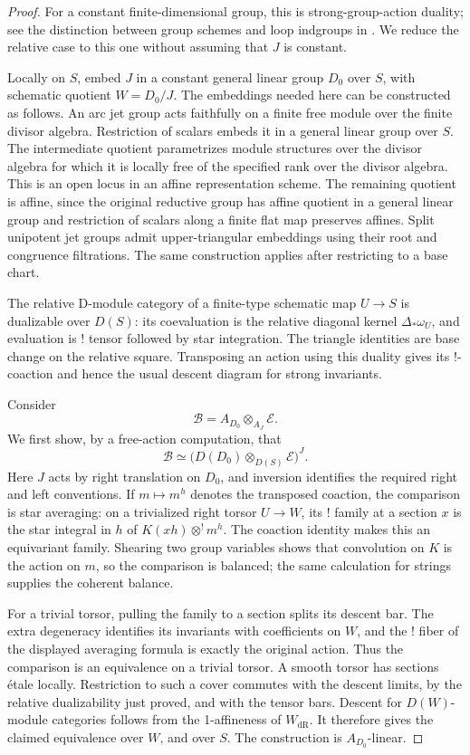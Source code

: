 \documentclass[11pt]{article}
\numberwithin{equation}{section}
\theoremstyle{definition}
\theoremstyle{remark}
\begin{document}
\begin{proof}
For a constant finite-dimensional group, this is strong-group-action
duality; see the distinction between group schemes and loop indgroups
in \cite[Section~1.5.4]{RaskinW}.  We reduce the relative case to this
one without assuming that $J$ is constant.

Locally on $S$, embed $J$ in a constant general linear group $D_0$ over
$S$, with schematic quotient $W=D_0/J$.  The embeddings needed here
can be constructed as follows.  An arc jet group acts faithfully on a
finite free module over the finite divisor algebra.  Restriction of
scalars embeds it in a general linear group over $S$.  The intermediate
quotient parametrizes module structures over the divisor algebra for which it is
locally free of the specified rank over the divisor algebra.  This is
an open locus in an affine representation scheme.  The remaining
quotient is affine, since the original reductive group has affine
quotient in a general linear group and restriction of scalars along a
finite flat map preserves affines.  Split unipotent jet groups admit
upper-triangular embeddings using their root and congruence filtrations.
The same construction applies after restricting to a base chart.

The relative D-module category of a finite-type schematic map $U\to S$
is dualizable over $D(S)$: its coevaluation is the relative diagonal
kernel $\Delta_*\omega_U$, and evaluation is ! tensor followed by star
integration.  The triangle identities are base change on the relative
square.  Transposing an action using this duality gives its !-coaction
and hence the usual descent diagram for strong invariants.

Consider
\[
            \mathcal B=A_{D_0}\otimes_{A_J}\mathcal E.
\]
We first show, by a free-action computation, that
\[
       \mathcal B\simeq
          \bigl(D(D_0)\otimes_{D(S)}\mathcal E\bigr)^J.
\]
Here $J$ acts by right translation on $D_0$, and inversion identifies
the required right and left conventions.  If $m\mapsto m^h$ denotes
the transposed coaction, the comparison is star averaging: on a
trivialized right torsor $U\to W$, its ! family at a section $x$ is
the star integral in $h$ of
$K(xh)\otimes^!m^h$.  The coaction identity makes this an equivariant
family.  Shearing two group variables shows that convolution on $K$
is the action on $m$, so the comparison is balanced; the same
calculation for strings supplies the coherent balance.

For a trivial torsor, pulling the family to a section splits its
descent bar.  The extra degeneracy identifies its invariants with
coefficients on $W$, and the ! fiber of the displayed averaging
formula is exactly the original action.  Thus the comparison is an
equivalence on a trivial torsor.  A smooth torsor has sections \'etale
locally.  Restriction to such a cover commutes with the descent limits,
by the relative dualizability just proved, and with the tensor bars.
Descent for $D(W)$-module categories follows from the 1-affineness of
$W_{\mathrm{dR}}$.  It therefore gives the claimed equivalence over
$W$, and over $S$.  The construction is $A_{D_0}$-linear.


\end{proof}
\end{document}
